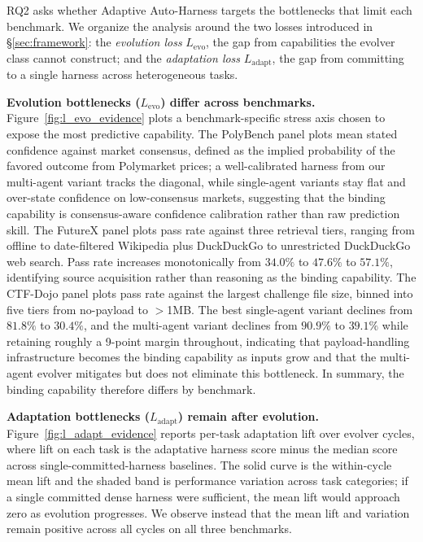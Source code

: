 \documentclass[11pt]{article}
\theoremstyle{plain}
\newcommand{\Levo}{L_{\text{evo}}}
\newcommand{\Ladapt}{L_{\text{adapt}}}
\begin{document}
RQ2 asks whether Adaptive Auto-Harness targets the bottlenecks that limit each benchmark. We organize the analysis around the two losses introduced in \S\ref{sec:framework}: the \emph{evolution loss} $\Levo$, the gap from capabilities the evolver class cannot construct; and the \emph{adaptation loss} $\Ladapt$, the gap from committing to a single harness across heterogeneous tasks.

\noindent\textbf{Evolution bottlenecks ($\Levo$) differ across benchmarks.} Figure~\ref{fig:l_evo_evidence} plots a benchmark-specific stress axis chosen to expose the most predictive capability. The PolyBench panel plots mean stated confidence against market consensus, defined as the implied probability of the favored outcome from Polymarket prices; a well-calibrated harness from our multi-agent variant tracks the diagonal, while single-agent variants stay flat and over-state confidence on low-consensus markets, suggesting that the binding capability is consensus-aware confidence calibration rather than raw prediction skill. The FutureX panel plots pass rate against three retrieval tiers, ranging from offline to date-filtered Wikipedia plus DuckDuckGo to unrestricted DuckDuckGo web search. Pass rate increases monotonically from $34.0\%$ to $47.6\%$ to $57.1\%$, identifying source acquisition rather than reasoning as the binding capability. The CTF-Dojo panel plots pass rate against the largest challenge file size, binned into five tiers from no-payload to $>$1MB. The best single-agent variant declines from $81.8\%$ to $30.4\%$, and the multi-agent variant declines from $90.9\%$ to $39.1\%$ while retaining roughly a 9-point margin throughout, indicating that payload-handling infrastructure becomes the binding capability as inputs grow and that the multi-agent evolver mitigates but does not eliminate this bottleneck. In summary, the binding capability therefore differs by benchmark.

\noindent\textbf{Adaptation bottlenecks ($\Ladapt$) remain after evolution.} Figure~\ref{fig:l_adapt_evidence} reports per-task adaptation lift over evolver cycles, where lift on each task is the adaptative harness score minus the median score across single-committed-harness baselines. The solid curve is the within-cycle mean lift and the shaded band is performance variation across task categories; if a single committed dense harness were sufficient, the mean lift would approach zero as evolution progresses. We observe instead that the mean lift and variation remain positive across all cycles on all three benchmarks. 
\end{document}
